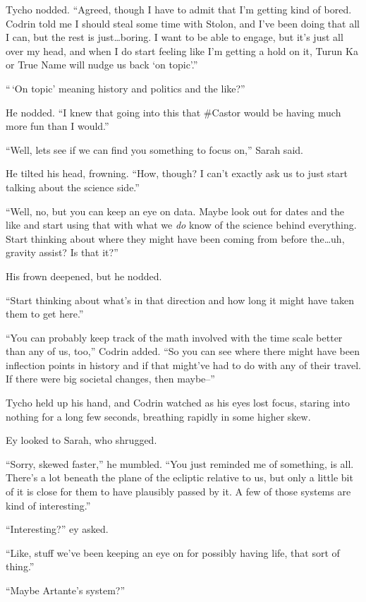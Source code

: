 Tycho nodded. ``Agreed, though I have to admit that I'm getting kind of bored. Codrin told me I should steal some time with Stolon, and I've been doing that all I can, but the rest is just\ldots boring. I want to be able to engage, but it's just all over my head, and when I do start feeling like I'm getting a hold on it, Turun Ka or True Name will nudge us back `on topic'.''

``\,`On topic' meaning history and politics and the like?''

He nodded. ``I knew that going into this that \#Castor would be having much more fun than I would.''

``Well, lets see if we can find you something to focus on,'' Sarah said.

He tilted his head, frowning. ``How, though? I can't exactly ask us to just start talking about the science side.''

``Well, no, but you can keep an eye on data. Maybe look out for dates and the like and start using that with what we \emph{do} know of the science behind everything. Start thinking about where they might have been coming from before the\ldots uh, gravity assist? Is that it?''

His frown deepened, but he nodded.

``Start thinking about what's in that direction and how long it might have taken them to get here.''

``You can probably keep track of the math involved with the time scale better than any of us, too,'' Codrin added. ``So you can see where there might have been inflection points in history and if that might've had to do with any of their travel. If there were big societal changes, then maybe--''

Tycho held up his hand, and Codrin watched as his eyes lost focus, staring into nothing for a long few seconds, breathing rapidly in some higher skew.

Ey looked to Sarah, who shrugged.

``Sorry, skewed faster,'' he mumbled. ``You just reminded me of something, is all. There's a lot beneath the plane of the ecliptic relative to us, but only a little bit of it is close for them to have plausibly passed by it. A few of those systems are kind of interesting.''

``Interesting?'' ey asked.

``Like, stuff we've been keeping an eye on for possibly having life, that sort of thing.''

``Maybe Artante's system?''

